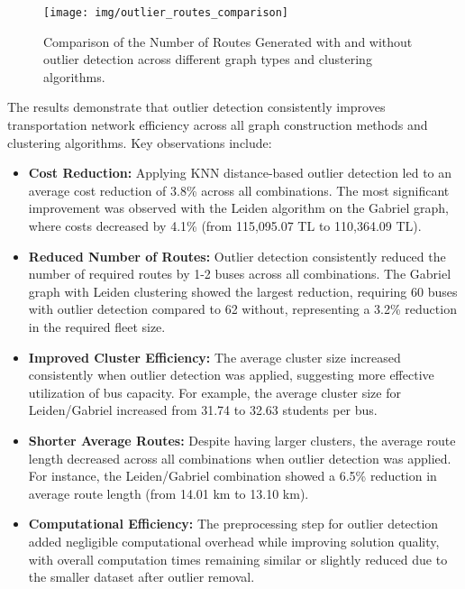 \begin{figure}[h]
    \centering
    \texttt{[image: img/outlier\_routes\_comparison]}
    \caption{Comparison of the Number of Routes Generated with and without outlier detection across different graph types and clustering algorithms.}
    \label{fig:outlier_routes_comparison}
\end{figure}

The results demonstrate that outlier detection consistently improves transportation network efficiency across all graph construction methods and clustering algorithms. Key observations include:

\begin{itemize}
    \item \textbf{Cost Reduction:} Applying KNN distance-based outlier detection led to an average cost reduction of 3.8\% across all combinations. The most significant improvement was observed with the Leiden algorithm on the Gabriel graph, where costs decreased by 4.1\% (from 115,095.07 TL to 110,364.09 TL).
    
    \item \textbf{Reduced Number of Routes:} Outlier detection consistently reduced the number of required routes by 1-2 buses across all combinations. The Gabriel graph with Leiden clustering showed the largest reduction, requiring 60 buses with outlier detection compared to 62 without, representing a 3.2\% reduction in the required fleet size.
    
    \item \textbf{Improved Cluster Efficiency:} The average cluster size increased consistently when outlier detection was applied, suggesting more effective utilization of bus capacity. For example, the average cluster size for Leiden/Gabriel increased from 31.74 to 32.63 students per bus.
    
    \item \textbf{Shorter Average Routes:} Despite having larger clusters, the average route length decreased across all combinations when outlier detection was applied. For instance, the Leiden/Gabriel combination showed a 6.5\% reduction in average route length (from 14.01 km to 13.10 km).
    
    \item \textbf{Computational Efficiency:} The preprocessing step for outlier detection added negligible computational overhead while improving solution quality, with overall computation times remaining similar or slightly reduced due to the smaller dataset after outlier removal.
\end{itemize}

